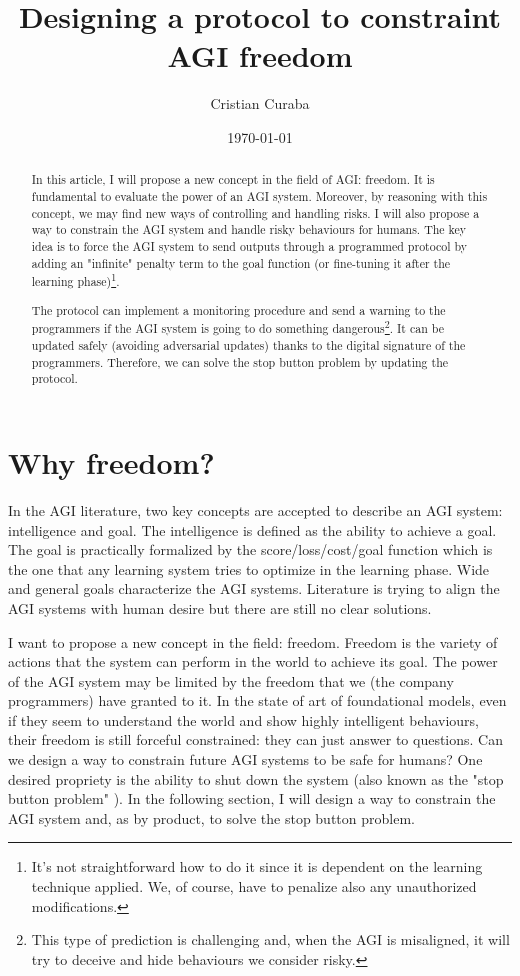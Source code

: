 \documentclass{article}
\begin{document}
\title{Designing a protocol to constraint AGI freedom}
\author{Cristian Curaba}
\date{\today}

\maketitle

\begin{abstract}
    In this article, I will propose a new concept in the field of AGI: freedom. It is fundamental to evaluate the power of an AGI system. Moreover, by reasoning with this concept, we may find new ways of controlling and handling risks.
    I will also propose a way to constrain the AGI system and handle risky behaviours for humans. The key idea is to force the AGI system to send outputs through a programmed protocol by adding an "infinite" penalty term to the goal function (or fine-tuning it after the learning phase)\footnote{It's not straightforward how to do it since it is dependent on the learning technique applied. We, of course, have to penalize also any unauthorized modifications.}.
    
    The protocol can implement a monitoring procedure and send a warning to the programmers if the AGI system is going to do something dangerous\footnote{This type of prediction is challenging and, when the AGI is misaligned, it will try to deceive and hide behaviours we consider risky.}. 
    It can be updated safely (avoiding adversarial updates) thanks to the digital signature of the programmers. Therefore, we can solve the stop button problem by updating the protocol. 
    
\end{abstract}

\section{Why freedom?}
In the AGI literature,  two key concepts are accepted to describe an AGI system: intelligence and goal.
The intelligence is defined as the ability to achieve a goal.
The goal is practically formalized by the score/loss/cost/goal function which is the one that any learning system tries to optimize in the learning phase.
Wide and general goals characterize the AGI systems.
Literature is trying to align the AGI systems with human desire but there are still no clear solutions.

I want to propose a new concept in the field: freedom. 
Freedom is the variety of actions that the system can perform in the world to achieve its goal.
The power of the AGI system may be limited by the freedom that we (the company programmers) have granted to it.
In the state of art of foundational models, even if they seem to understand the world and show highly intelligent behaviours, their freedom is still forceful constrained: they can just answer to questions.
Can we design a way to constrain future AGI systems to be safe for humans?
One desired propriety is the ability to shut down the system (also known as the "stop button problem" \cite{corrigibility}).
In the following section, I will design a way to constrain the AGI system and, as by product, to solve the stop button problem.
\end{document}
